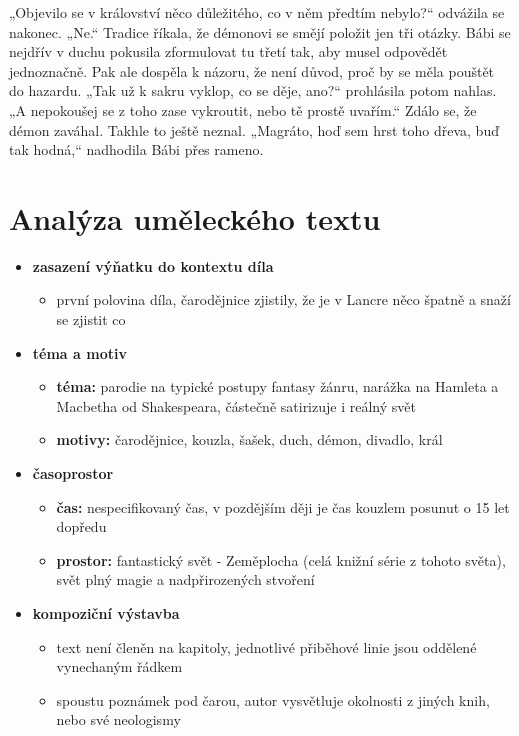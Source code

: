 \documentclass[11pt]{article}
\begin{document}
„Objevilo se v království něco důležitého, co v něm předtím nebylo?“ odvážila se nakonec.
„Ne.“
Tradice říkala, že démonovi se smějí položit jen tři otázky. Bábi se nejdřív v duchu pokusila zformulovat tu třetí tak, aby musel odpovědět jednoznačně. Pak ale dospěla k názoru, že není důvod, proč by se měla pouštět do hazardu.
„Tak už k sakru vyklop, co se děje, ano?“ prohlásila potom nahlas. „A nepokoušej se z toho zase vykroutit, nebo tě prostě uvařím.“
Zdálo se, že démon zaváhal. Takhle to ještě neznal.
„Magráto, hoď sem hrst toho dřeva, buď tak hodná,“ nadhodila Bábi přes rameno.
    \section*{Analýza uměleckého textu}
    \begin{itemize}
        \item\textbf{zasazení výňatku do kontextu díla}
        \begin{itemize}
            \item první polovina díla, čarodějnice zjistily, že je v Lancre něco špatně a snaží se zjistit co
        \end{itemize}
        \item\textbf{téma a motiv}
        \begin{itemize}
            \item\textbf{téma: }parodie na typické postupy fantasy žánru, narážka na Hamleta a Macbetha od Shakespeara, částečně satirizuje i reálný svět
            \item\textbf{motivy: }čarodějnice, kouzla, šašek, duch, démon, divadlo, král
        \end{itemize}
        \item\textbf{časoprostor}
        \begin{itemize}
            \item\textbf{čas: }nespecifikovaný čas, v pozdějším ději je čas kouzlem posunut o 15 let dopředu
            \item\textbf{prostor: }fantastický svět - Zeměplocha (celá knižní série z tohoto světa), svět plný magie a nadpřirozených stvoření
        \end{itemize}
        \item\textbf{kompoziční výstavba}
        \begin{itemize}
            \item text není členěn na kapitoly, jednotlivé přiběhové linie jsou oddělené vynechaným řádkem
            \item spoustu poznámek pod čarou, autor vysvětluje okolnosti z jiných knih, nebo své neologismy

\end{itemize}
\end{itemize}
\end{document}
